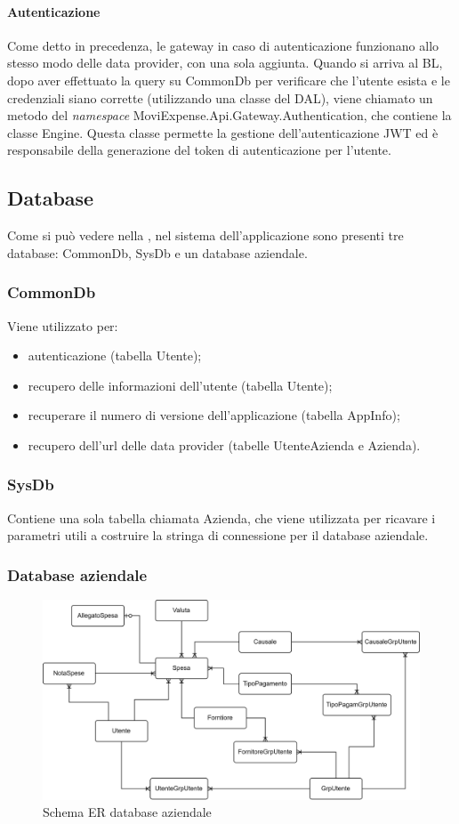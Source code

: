 \paragraph{Autenticazione} Come detto in precedenza, le  gateway in caso di autenticazione funzionano allo stesso modo delle data provider, con una sola aggiunta. Quando si arriva al BL, dopo aver effettuato la query su CommonDb per verificare che l'utente esista e le credenziali siano corrette (utilizzando una classe del DAL), viene chiamato un metodo del \emph{namespace} MoviExpense.Api.Gateway.Authentication, che contiene la classe Engine. Questa classe permette la gestione dell'autenticazione JWT ed è responsabile della generazione del token di autenticazione per l'utente.


\subsection{Database}

Come si può vedere nella , nel sistema dell'applicazione sono presenti tre database: CommonDb, SysDb e un database aziendale.

\subsubsection{CommonDb}

Viene utilizzato per:
\begin{itemize}
    \item autenticazione (tabella Utente);
    \item recupero delle informazioni dell'utente (tabella Utente);
    \item recuperare il numero di versione dell'applicazione (tabella AppInfo);
    \item recupero dell'url delle  data provider (tabelle UtenteAzienda e Azienda).
\end{itemize}

\subsubsection{SysDb}

Contiene una sola tabella chiamata Azienda, che viene utilizzata per ricavare i parametri utili a costruire la stringa di connessione per il database aziendale.

\subsubsection{Database aziendale}

\begin{figure}[H]
    \centering
    \includegraphics[width=\columnwidth]{images/ER moviEXPENSE.png}
    \caption{Schema ER database aziendale}
\end{figure}
